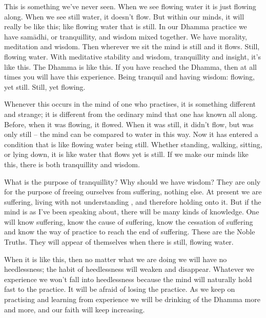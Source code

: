 This is something we've never seen. When we see flowing water it is just flowing along. When we see still water, it doesn't flow. But within our minds, it will really be like this; like flowing water that is still. In our Dhamma practice we have sam\=adhi, or tranquillity, and wisdom mixed together. We have morality, meditation and wisdom. Then wherever we sit the mind is still and it flows. Still, flowing water. With meditative stability and wisdom, tranquillity and insight, it's like this. The Dhamma is like this. If you have reached the Dhamma, then at all times you will have this experience. Being tranquil and having wisdom: flowing, yet still. Still, yet flowing.

Whenever this occurs in the mind of one who practises, it is something different and strange; it is different from the ordinary mind that one has known all along. Before, when it was flowing, it flowed. When it was still, it didn't flow, but was only still -- the mind can be compared to water in this way. Now it has entered a condition that is like flowing water being still. Whether standing, walking, sitting, or lying down, it is like water that flows yet is still. If we make our minds like this, there is both tranquillity and wisdom.

What is the purpose of tranquillity? Why should we have wisdom? They are only for the purpose of freeing ourselves from suffering, nothing else. At present we are suffering, living with  not understanding , and therefore holding onto it. But if the mind is as I've been speaking about, there will be many kinds of knowledge. One will know suffering, know the cause of suffering, know the cessation of suffering and know the way of practice to reach the end of suffering. These are the Noble Truths. They will appear of themselves when there is still, flowing water.

When it is like this, then no matter what we are doing we will have no heedlessness; the habit of heedlessness will weaken and disappear. Whatever we experience we won't fall into heedlessness because the mind will naturally hold fast to the practice. It will be afraid of losing the practice. As we keep on practising and learning from experience we will be drinking of the Dhamma more and more, and our faith will keep increasing.

